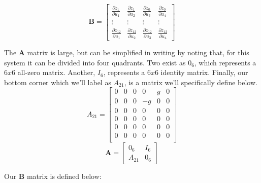 \documentclass{article}
\begin{document}
\begin{equation}
    \boldsymbol{B} = \begin{bmatrix}
        \frac{\partial \dot{z}_1}{\partial{u_1}} & \frac{\partial \dot{z}_1}{\partial{u_2}} & \frac{\partial \dot{z}_0}{\partial u_3} & \frac{\partial \dot{z}_0}{\partial u_4} \\
        \vdots & \vdots & \vdots & \vdots \\
        \frac{\partial \dot{z}_{12}}{\partial{u_1}} & \frac{\partial \dot{z}_{12}}{\partial{u_2}} & \frac{\partial \dot{z}_{12}}{\partial u_3} & \frac{\partial \dot{z}_{12}}{\partial u_4}
    \end{bmatrix}
\end{equation}

The $\boldsymbol{A}$ matrix is large, but can be simplified in writing by noting that, for this system it can be divided into four quadrants. Two exist as $0_6$, which represents a $6x6$ all-zero matrix. Another, $I_6$, represents a $6x6$ identity matrix. Finally, our bottom corner which we'll label as $A_{21}$, is a matrix we'll specifically define below.
\begin{equation}
    A_{21} = \begin{bmatrix}
        0 & 0 & 0 & 0 & g & 0 \\
        0 & 0 & 0 & -g & 0 & 0 \\
        0 & 0 & 0 & 0 & 0 & 0 \\
        0 & 0 & 0 & 0 & 0 & 0 \\
        0 & 0 & 0 & 0 & 0 & 0 \\
        0 & 0 & 0 & 0 & 0 & 0 \\
    \end{bmatrix}
\end{equation}
\begin{equation}
    \boldsymbol{A} = \begin{bmatrix}
        0_6 & I_6 \\
        A_{21} & 0_6
    \end{bmatrix}
\end{equation}

Our $\boldsymbol{B}$ matrix is defined below:
\end{document}
